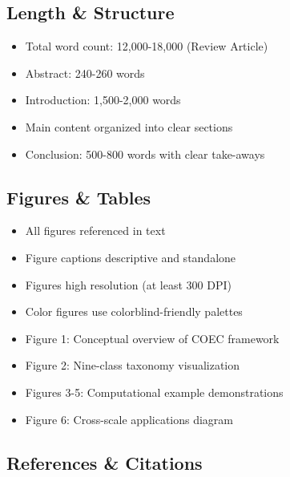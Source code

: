 \documentclass[11pt]{article}
\begin{document}
\subsection{Length \& Structure}

\begin{itemize}[label=$\square$]
    \item Total word count: 12,000-18,000 (Review Article)
    \item Abstract: 240-260 words
    \item Introduction: 1,500-2,000 words
    \item Main content organized into clear sections
    \item Conclusion: 500-800 words with clear take-aways
\end{itemize}

\subsection{Figures \& Tables}

\begin{itemize}[label=$\square$]
    \item All figures referenced in text
    \item Figure captions descriptive and standalone
    \item Figures high resolution (at least 300 DPI)
    \item Color figures use colorblind-friendly palettes
    \item Figure 1: Conceptual overview of COEC framework
    \item Figure 2: Nine-class taxonomy visualization
    \item Figures 3-5: Computational example demonstrations
    \item Figure 6: Cross-scale applications diagram
\end{itemize}

\subsection{References \& Citations}
\end{document}
